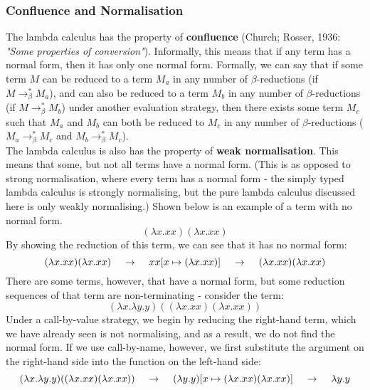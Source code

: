 \documentclass{article}
\begin{document}
\subsubsection{Confluence and Normalisation}
The lambda calculus has the property of \textbf{confluence} (Church; Rosser, 1936: \emph{"Some properties of conversion"}). Informally, this means that if any term has a normal form, then it has only one normal form. Formally, we can say that if some term $M$ can be reduced to a term $M_a$ in any number of $\beta$-reductions (if $M \rightarrow^{*}_{\beta} M_a$), and can also be reduced to a term $M_b$ in any number of $\beta$-reductions (if $M \rightarrow^{*}_{\beta} M_b$) under another evaluation strategy, then there exists some term $M_c$ such that $M_a$ and $M_b$ can both be reduced to $M_c$ in any number of $\beta$-reductions ($M_a \rightarrow^{*}_{\beta} M_c$ and $M_b \rightarrow^{*}_{\beta} M_c$).
\\\indent The lambda calculus is also has the property of \textbf{weak normalisation}. This means that some, but not all terms have a normal form. (This is as opposed to strong normalisation, where every term has a normal form - the simply typed lambda calculus is strongly normalising, but the pure lambda calculus discussed here is only weakly normalising.) Shown below is an example of a term with no normal form.
\[ (\lambda x.xx)(\lambda x.xx) \]
By showing the reduction of this term, we can see that it has no normal form:
\[ (\lambda x.xx)(\lambda x.xx) \hspace{4mm} \rightarrow \hspace{4mm} xx[x \mapsto (\lambda x.xx)] \hspace{4mm} \rightarrow \hspace{4mm} (\lambda x.xx)(\lambda x.xx) \]
There are some terms, however, that have a normal form, but some reduction sequences of that term are non-terminating - consider the term:
\[ (\lambda x.\lambda y.y)((\lambda x.xx)(\lambda x.xx)) \]
Under a call-by-value strategy, we begin by reducing the right-hand term, which we have already seen is not normalising, and as a result, we do not find the normal form. If we use call-by-name, however, we first substitute the argument on the right-hand side into the function on the left-hand side:
\[ (\lambda x.\lambda y.y)((\lambda x.xx)(\lambda x.xx)) \hspace{4mm} \rightarrow \hspace{4mm} (\lambda y.y)[x \mapsto (\lambda x.xx)(\lambda x.xx)] \hspace{4mm} \rightarrow \hspace{4mm} \lambda y.y \]
\end{document}
